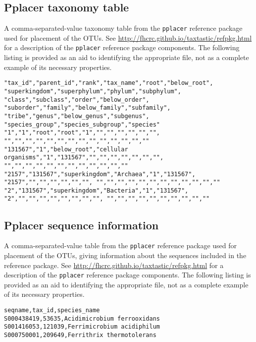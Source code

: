 \documentclass[12pt]{report}
\begin{document}
\subsection{Pplacer taxonomy table}\label{pplacer_taxa_table}
A comma-separated-value taxonomy table from the \texttt{pplacer}
reference package used for placement of the OTUs. See
\url{http://fhcrc.github.io/taxtastic/refpkg.html} for a description
of the \texttt{pplacer} reference package components. The following
listing is provided as an aid to identifying the appropriate file, not
as a complete example of its necessary properties. 

\begin{lstlisting}[caption=Beginning of an example taxonomy table file]
"tax_id","parent_id","rank","tax_name","root","below_root", "superkingdom","superphylum","phylum","subphylum", "class","subclass","order","below_order", "suborder","family","below_family","subfamily", "tribe","genus","below_genus","subgenus", "species_group","species_subgroup","species"
"1","1","root","root","1","","","","","","", "","","","","","","","","","","","","",""
"131567","1","below_root","cellular organisms","1","131567","","","","","","","", "","","","","","","","","","","",""
"2157","131567","superkingdom","Archaea","1","131567", "2157","","","","","","", "","","","","","","","","","","",""
"2","131567","superkingdom","Bacteria","1","131567", "2","","","","","","","","", "","","","","","","","","",""
\end{lstlisting}

\subsection{Pplacer sequence information}\label{pplacer_seq_info}
A comma-separated-value table from the \texttt{pplacer}
reference package used for placement of the OTUs, giving information
about the sequences included in the reference package. See 
\url{http://fhcrc.github.io/taxtastic/refpkg.html} for a description
of the \texttt{pplacer} reference package components.
The following
listing is provided as an aid to identifying the appropriate file, not
as a complete example of its necessary properties. 
\begin{lstlisting}[caption=Beginning of an example sequence information file]
seqname,tax_id,species_name
S000438419,53635,Acidimicrobium ferrooxidans
S001416053,121039,Ferrimicrobium acidiphilum
S000750001,209649,Ferrithrix thermotolerans
\end{lstlisting}
\end{document}
